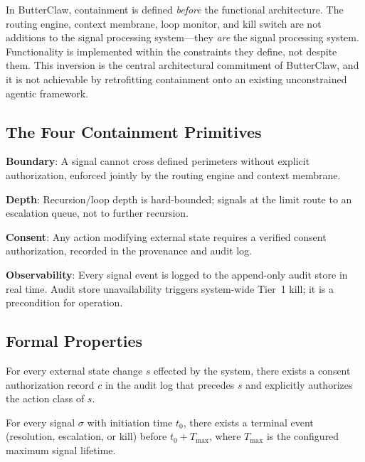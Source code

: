 \documentclass[11pt,a4paper]{article}
\newenvironment{property}[1][]
{
  \begin{tcolorbox}[
    title={#1},
    colback=white,
    colframe=black!50,
    fonttitle=\bfseries
  ]
}
{
  \end{tcolorbox}
}
\begin{document}
In ButterClaw, containment is defined \emph{before} the functional architecture. The routing 
engine, context membrane, loop monitor, and kill switch are not additions to the signal
processing system---they \emph{are} the signal processing system. Functionality is implemented
within the constraints they define, not despite them. This inversion is the central architectural
commitment of ButterClaw, and it is not achievable by retrofitting containment onto an existing
unconstrained agentic framework.

\subsection{The Four Containment Primitives}

\begin{definitionbox}[title=Definition 7.1 --- The Four Containment Primitives]
\textbf{Boundary}: A signal cannot cross defined perimeters without explicit authorization,
enforced jointly by the routing engine and context membrane.\

\vspace{4pt}
\textbf{Depth}: Recursion/loop depth is hard-bounded; signals at the limit route to an
escalation queue, not to further recursion.\

\vspace{4pt}
\textbf{Consent}: Any action modifying external state requires a verified consent authorization,
recorded in the provenance and audit log.\

\vspace{4pt}
\textbf{Observability}: Every signal event is logged to the append-only audit store in real time.
Audit store unavailability triggers system-wide Tier~1 kill; it is a precondition for operation.
\end{definitionbox}

\subsection{Formal Properties}

\begin{property}[Safety]
For every external state change $s$ effected by the system, there exists a consent authorization
record $c$ in the audit log that precedes $s$ and explicitly authorizes the action class of $s$.
\end{property}

\begin{property}[Liveness]
For every signal $\sigma$ with initiation time $t_0$, there exists a terminal event (resolution,
escalation, or kill) before $t_0 + T_{\max}$, where $T_{\max}$ is the configured maximum signal
lifetime.
\end{property}
\end{document}
